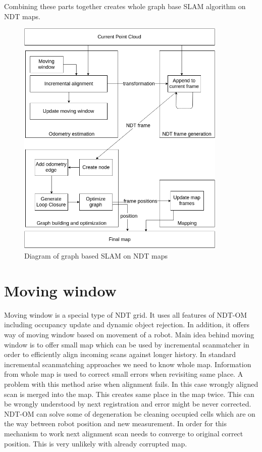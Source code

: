 Combining these parts together creates whole graph base \gls{SLAM} algorithm on NDT maps.   

\begin{figure}
	\centering
	\includegraphics[width=100mm]{../img/algorithm_runtime.png}
	\caption{Diagram of graph based SLAM on NDT maps}
	\label{fig:algorithm}
\end{figure}
  
\newpage


\section{Moving window}
\label{sec:window}
Moving window is a special type of \gls{NDT} grid. It uses all features of \gls{NDT-OM} including occupancy update and dynamic object rejection. In addition, it offers way of moving window based on movement of a robot. Main idea behind moving window is to offer small map which can be used by incremental scanmatcher in order to efficiently align incoming scans against longer history. In standard incremental scanmatching approaches we need to know whole map. Information from whole map is used to correct small errors  when revisiting same place. A problem with this method arise when alignment fails. In this case wrongly aligned scan is merged into the map. This creates same place in the map twice. This can be wrongly understood by next registration and error might be never corrected. \gls{NDT-OM} can solve some of degeneration be cleaning occupied cells which are on the way between robot position and new measurement. In order for this mechanism to work next alignment scan needs to converge to original correct position. This is very unlikely with already corrupted map.

